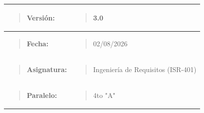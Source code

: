 \documentclass[
]{article}
\newcounter{none} %
\begin{document}
{\def\LTcaptype{none} %
\begin{longtable}[]{@{}
  >{\raggedright\arraybackslash}p{}
  >{\raggedright\arraybackslash}p{}@{}}
\toprule\noalign{}
\begin{minipage}[b]{\linewidth}\raggedright
\begin{quote}
\textbf{Versión:}
\end{quote}
\end{minipage} & \begin{minipage}[b]{\linewidth}\raggedright
\begin{quote}
3.0
\end{quote}
\end{minipage} \\
\midrule\noalign{}
\endhead
\bottomrule\noalign{}
\endlastfoot
\begin{minipage}[t]{\linewidth}\raggedright
\begin{quote}
\textbf{Fecha:}
\end{quote}
\end{minipage} & \begin{minipage}[t]{\linewidth}\raggedright
\begin{quote}
02/08/2026
\end{quote}
\end{minipage} \\
\begin{minipage}[t]{\linewidth}\raggedright
\begin{quote}
\textbf{Asignatura:}
\end{quote}
\end{minipage} & \begin{minipage}[t]{\linewidth}\raggedright
\begin{quote}
Ingeniería de Requisitos (ISR-401)
\end{quote}
\end{minipage} \\
\begin{minipage}[t]{\linewidth}\raggedright
\begin{quote}
\textbf{Paralelo:}
\end{quote}
\end{minipage} & \begin{minipage}[t]{\linewidth}\raggedright
\begin{quote}
4to "A"
\end{quote}
\end{minipage} \\

\end{longtable}}
\end{document}
